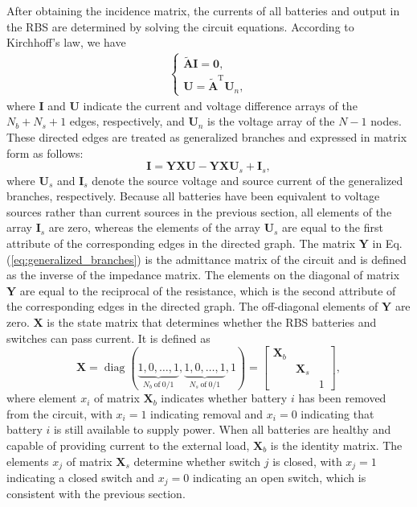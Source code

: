 \documentclass{article}
\DeclareMathOperator{\diag}{diag}
\def\T{\mathrm{T}}
\begin{document}
After obtaining the incidence matrix, the currents of all batteries and output in the RBS are determined by solving the circuit equations.
According to Kirchhoff's law, we have
\begin{align}\label{eq:Kirchhoffs_law}
    \begin{cases}
        \bm{\tilde{A}} \bm{I} = \bm{0}, \\
        \bm{U}        = \bm{\tilde{A}}^\T \bm{U}_n,
    \end{cases}
\end{align}
where $\bm{I}$ and $\bm{U}$ indicate the current and voltage difference arrays of the $N_b+N_s+1$ edges, respectively, and
$\bm{U}_n$ is the voltage array of the $N-1$ nodes.
These directed edges are treated as generalized branches and expressed in matrix form as follows:
\begin{equation}\label{eq:generalized_branches}
    \bm{I} = \bm{Y}\bm{X} \bm{U} - \bm{Y}\bm{X} \bm{U}_s +\bm{I}_s,
\end{equation}
where $\bm{U}_s$ and $\bm{I}_s$ denote the source voltage and source current of the generalized branches, respectively.
Because all batteries have been equivalent to voltage sources rather than current sources in the previous section, all elements of the array $\bm{I}_s$ are zero, 
whereas the elements of the array $\bm{U}_s$ are equal to the first attribute of the corresponding edges in the directed graph.
The matrix $\bm{Y}$ in Eq. (\ref{eq:generalized_branches}) is the admittance matrix of the circuit and is defined as the inverse of the impedance matrix.
The elements on the diagonal of matrix $\bm{Y}$ are equal to the reciprocal of the resistance, which is the second attribute of the corresponding edges in the directed graph. The off-diagonal elements of $\bm{Y}$ are zero.
$\bm{X}$ is the state matrix that determines whether the RBS batteries and switches can pass current.
It is defined as
\begin{equation}\label{eq:X}
    \bm{X} = \diag(
    \underbrace{1, 0, \dots, 1}_{N_b~\text{of}~0/1},
    \underbrace{1, 0, \dots, 1}_{N_s~\text{of}~0/1},
    1)
    =\begin{bmatrix}
        \bm{X}_b & & \\
        & \bm{X}_s &\\
        & & 1
    \end{bmatrix},
\end{equation}
where element $x_i$ of matrix $\bm{X}_b$ indicates whether battery $i$ has been removed from the circuit, with $x_i=1$ indicating removal and $x_i=0$ indicating that battery $i$ is still available to supply power. 
When all batteries are healthy and capable of providing current to the external load, $\bm{X}_b$ is the identity matrix. 
The elements $x_j$ of  matrix $\bm{X}_s$ determine whether switch $j$ is closed, with $x_j=1$ indicating a closed switch and $x_j=0$ indicating an open switch, which is consistent with the previous section.
\end{document}
